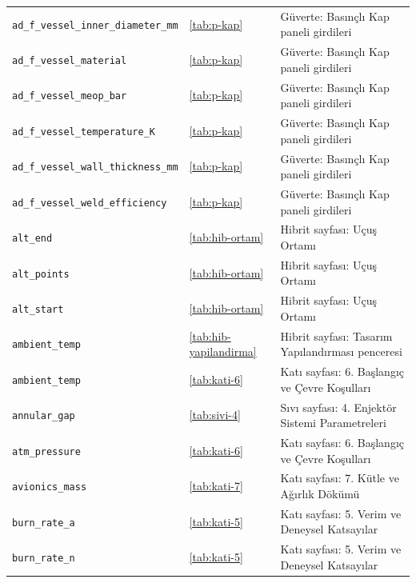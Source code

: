 \documentclass[11pt,a4paper]{article}
\begin{document}
{\begin{longtable}{@{}>{\raggedright\arraybackslash}p{5.2cm}p{1.4cm}>{\raggedright\arraybackslash}p{7.4cm}@{}}
\texttt{ad\_\allowbreak{}f\_\allowbreak{}vessel\_\allowbreak{}inner\_\allowbreak{}diameter\_\allowbreak{}mm} & \ref{tab:p-kap} & Güverte: Basınçlı Kap paneli girdileri \\
\texttt{ad\_\allowbreak{}f\_\allowbreak{}vessel\_\allowbreak{}material} & \ref{tab:p-kap} & Güverte: Basınçlı Kap paneli girdileri \\
\texttt{ad\_\allowbreak{}f\_\allowbreak{}vessel\_\allowbreak{}meop\_\allowbreak{}bar} & \ref{tab:p-kap} & Güverte: Basınçlı Kap paneli girdileri \\
\texttt{ad\_\allowbreak{}f\_\allowbreak{}vessel\_\allowbreak{}temperature\_\allowbreak{}K} & \ref{tab:p-kap} & Güverte: Basınçlı Kap paneli girdileri \\
\texttt{ad\_\allowbreak{}f\_\allowbreak{}vessel\_\allowbreak{}wall\_\allowbreak{}thickness\_\allowbreak{}mm} & \ref{tab:p-kap} & Güverte: Basınçlı Kap paneli girdileri \\
\texttt{ad\_\allowbreak{}f\_\allowbreak{}vessel\_\allowbreak{}weld\_\allowbreak{}efficiency} & \ref{tab:p-kap} & Güverte: Basınçlı Kap paneli girdileri \\
\texttt{alt\_\allowbreak{}end} & \ref{tab:hib-ortam} & Hibrit sayfası: Uçuş Ortamı \\
\texttt{alt\_\allowbreak{}points} & \ref{tab:hib-ortam} & Hibrit sayfası: Uçuş Ortamı \\
\texttt{alt\_\allowbreak{}start} & \ref{tab:hib-ortam} & Hibrit sayfası: Uçuş Ortamı \\
\texttt{ambient\_\allowbreak{}temp} & \ref{tab:hib-yapilandirma} & Hibrit sayfası: Tasarım Yapılandırması penceresi \\
\texttt{ambient\_\allowbreak{}temp} & \ref{tab:kati-6} & Katı sayfası: 6. Başlangıç ve Çevre Koşulları \\
\texttt{annular\_\allowbreak{}gap} & \ref{tab:sivi-4} & Sıvı sayfası: 4. Enjektör Sistemi Parametreleri \\
\texttt{atm\_\allowbreak{}pressure} & \ref{tab:kati-6} & Katı sayfası: 6. Başlangıç ve Çevre Koşulları \\
\texttt{avionics\_\allowbreak{}mass} & \ref{tab:kati-7} & Katı sayfası: 7. Kütle ve Ağırlık Dökümü \\
\texttt{burn\_\allowbreak{}rate\_\allowbreak{}a} & \ref{tab:kati-5} & Katı sayfası: 5. Verim ve Deneysel Katsayılar \\
\texttt{burn\_\allowbreak{}rate\_\allowbreak{}n} & \ref{tab:kati-5} & Katı sayfası: 5. Verim ve Deneysel Katsayılar \\

\end{longtable}}
\end{document}
